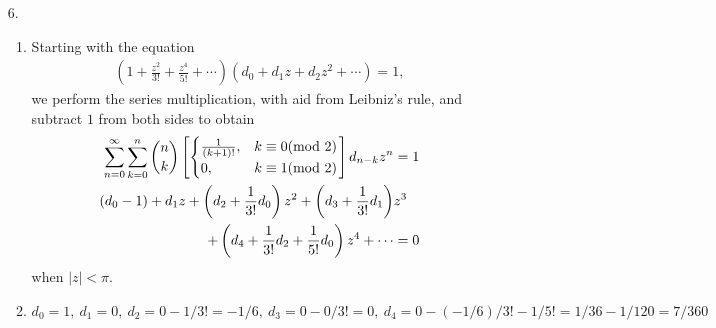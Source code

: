 \documentclass[a4paper,12pt]{article}
\begin{document}
\begin{enumerate}
    \item[6.]
        \begin{enumerate}
            \item
                Starting with the equation
                \begin{align*}
                    \left( 1 + \frac{z^2}{3!} + \frac{z^4}{5!} + \cdots \right) (d_0 + d_1 z + d_2 z^2 + \cdots) = 1,
                \end{align*}
                we perform the series multiplication, with aid from Leibniz's rule, and subtract $1$ from both sides to obtain
                \begin{align*}
                    \sum_{n = 0}^\infty \sum_{k = 0}^n \dbinom{n}{k} \left[ \begin{cases}
                        \frac{1}{(k + 1)!}, &k \equiv 0 (\text{mod }2) \\
                        0, &k \equiv 1 (\text{mod }2)
                    \end{cases} \right] d_{n - k} z^n &= 1 \\
                    (d_0 - 1) + d_1 z + \left( d_2 + \frac{1}{3!} d_0 \right) z^2 + \left( d_3 + \frac{1}{3!} d_1 \right) &z^3 \\
                    + \left( d_4 + \frac{1}{3!} d_2 + \frac{1}{5!} d_0 \right) z^4 + \cdots &= 0
                \end{align*}
                when $|z| < \pi$.

            \item
                $d_0 = 1,\ d_1 = 0,\ d_2 = 0 - 1/3! = -1/6,\ d_3 = 0 - 0/3! = 0,\ d_4 = 0 - (-1/6)/3! - 1/5! = 1/36 - 1/120 = 7/360$
        \end{enumerate}


\end{enumerate}
\end{document}

